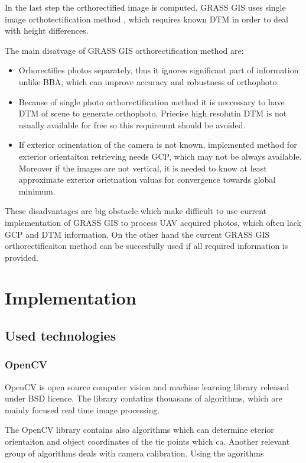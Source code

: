 \documentclass[a4paper,12pt]{report}
\begin{document}
In the last step the orthorectified image is computed. GRASS GIS uses single image orthotectification
method \label{sec:single_ortho}, which requires known DTM in order to deal with height differences. 


The main disatvage of GRASS GIS orthorectification method are:
\begin{itemize}
\item Orhorectifies photos separately, thus it ignores significant part of information unlike BBA,
 which can improve accuracy and robustness of orthophoto. 
\item Because of single photo orthorectification method it is neccessary to have DTM of scene to 
generate orthophoto. Priecise high resolutin DTM is not usually available for free so this 
requiremnt should be avoided.
\item If exterior orinentation of the camera is not known, implemented method for exterior
orientaiton retrieving needs GCP, which may not be always available. Moreover  if the images 
are not vertical, it is needed to know at least approximate exterior orietnation valuas for 
convergence towards global minimum.
\end{itemize}

These disadvantages are big obstacle which make difficult to use current implementation of GRASS GIS 
to process UAV acquired photos, which often lack GCP and DTM information.
On the other hand the current GRASS GIS orthorectificaiton method can be succesfully used  
if all required information is provided.

\chapter{Implementation}

\section{Used technologies}

\subsection{OpenCV}

OpenCV is open source computer vision and machine learning library released under BSD licence. 
The library contatins thouasans of algorithms, which are mainly focused real time image processing.


The OpenCV library contains also algorithms which can determine eterior orientaiton and object coordinates 
of the tie points which ca. 
Another relevant group of algorithms deals with camera calibration. Using the agorithms
\end{document}
